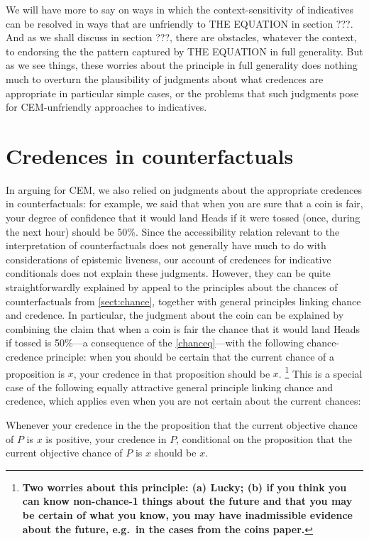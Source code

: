 \documentclass[If.tex]{subfiles}
\begin{document}
We will have more to say on ways in which the context-sensitivity of indicatives can be resolved in ways that are unfriendly to THE EQUATION in section ???. And as we shall discuss in section ???, there are obstacles, whatever the context, to endorsing the the pattern captured by THE EQUATION in full generality. But as we see things, these worries about the principle in full generality does nothing much to overturn the plausibility of judgments about what credences are appropriate in particular simple cases, or the problems that such judgments pose for CEM-unfriendly approaches to indicatives.




\section{Credences in counterfactuals}\label{sect:cfcredence}
In arguing for CEM, we also relied on judgments about the appropriate credences in counterfactuals: for example, we said that when you are sure that a coin is fair, your degree of confidence that it would land Heads if it were tossed (once, during the next hour) should be 50\%.  Since the accessibility relation relevant to the interpretation of counterfactuals does not generally have much to do with considerations of epistemic liveness, our account of credences for indicative conditionals does not explain these judgments.  However, they can be quite straightforwardly explained by appeal to the principles about the chances of counterfactuals from \autoref{sect:chance}, together with general principles linking chance and credence.  In particular, the judgment about the coin can be explained by combining the claim that when a coin is fair the chance that it would land Heads if tossed is 50\%---a consequence of the \ref{chanceq}---with the following chance-credence principle: when you should be certain that the current chance of a proposition is $x$, your credence in that proposition should be $x$.%
\footnote{\textbf{Two worries about this principle: (a) Lucky; (b) if you think you can know non-chance-1 things about the future and that you may be certain of what you know, you may have inadmissible evidence about the future, e.g.~in the cases from the coins paper.}} 
This is a special case of the following equally attractive general principle linking chance and credence, which applies even when you are not certain about the current chances:
\begin{prop}
	 \label{currentpp}
	Whenever your credence in the the proposition that the current objective chance of $P$ is $x$ is positive, your credence in $P$, conditional on the proposition that the current objective chance of $P$ is $x$ should be $x$.
\end{prop}
\end{document}
